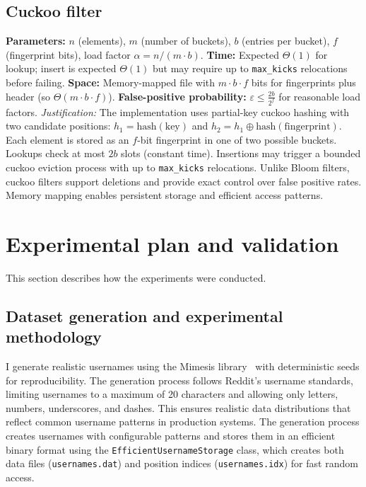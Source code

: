 \documentclass[sigconf]{acmart}
\begin{document}
\subsection{Cuckoo filter}
\textbf{Parameters:} $n$ (elements), $m$ (number of buckets), $b$ (entries per bucket), $f$ (fingerprint bits), load factor $\alpha=n/(m\cdot b)$.\newline
\textbf{Time:} Expected $\Theta(1)$ for lookup; insert is expected $\Theta(1)$ but may require up to \texttt{max\_kicks} relocations before failing.\newline
\textbf{Space:} Memory-mapped file with $m \cdot b \cdot f$ bits for fingerprints plus header (so $\Theta(m \cdot b \cdot f)$).\newline
\textbf{False-positive probability:} $\varepsilon \leq \frac{2b}{2^f}$ for reasonable load factors.\newline
\textit{Justification:} The implementation uses partial-key cuckoo hashing with two candidate positions: $h_1 = \text{hash}(\text{key})$ and $h_2 = h_1 \oplus \text{hash}(\text{fingerprint})$. Each element is stored as an $f$-bit fingerprint in one of two possible buckets. Lookups check at most $2b$ slots (constant time). Insertions may trigger a bounded cuckoo eviction process with up to \texttt{max\_kicks} relocations. Unlike Bloom filters, cuckoo filters support deletions and provide exact control over false positive rates. Memory mapping enables persistent storage and efficient access patterns.


\section{Experimental plan and validation}
This section describes how the experiments were conducted.

\subsection{Dataset generation and experimental methodology}
I generate realistic usernames using the Mimesis library~\cite{mimesis} with deterministic seeds for reproducibility. The generation process follows Reddit's username standards, limiting usernames to a maximum of 20 characters and allowing only letters, numbers, underscores, and dashes. This ensures realistic data distributions that reflect common username patterns in production systems. The generation process creates usernames with configurable patterns and stores them in an efficient binary format using the \texttt{EfficientUsernameStorage} class, which creates both data files (\texttt{usernames.dat}) and position indices (\texttt{usernames.idx}) for fast random access.
\end{document}
